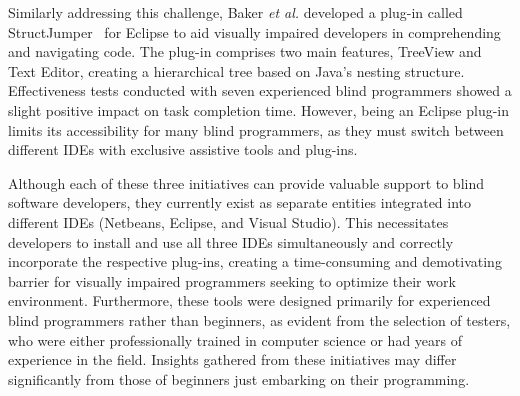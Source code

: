 Similarly addressing this challenge, Baker {\em et al.} developed a
plug-in called StructJumper~\cite{BakerML15} for Eclipse to aid
visually impaired developers in comprehending and navigating code. The
plug-in comprises two main features, TreeView and Text Editor,
creating a hierarchical tree based on Java's nesting
structure. Effectiveness tests conducted with seven experienced blind
programmers showed a slight positive impact on task completion time.
However, being an Eclipse plug-in limits its accessibility for many blind programmers, as they must switch between different IDEs with exclusive assistive tools and plug-ins.

Although each of these three initiatives can provide valuable support
to blind software developers, they currently exist as separate
entities integrated into different IDEs (Netbeans, Eclipse, and Visual
Studio). This necessitates developers to install and use all three
IDEs simultaneously and correctly incorporate the respective plug-ins,
creating a time-consuming and demotivating barrier for visually
impaired programmers seeking to optimize their work environment.
Furthermore, these tools were designed primarily for experienced blind
programmers rather than beginners, as evident from the selection of
testers, who were either professionally trained in computer science or
had years of experience in the field.
Insights gathered from these initiatives may differ significantly from
those of beginners just embarking on their programming.






